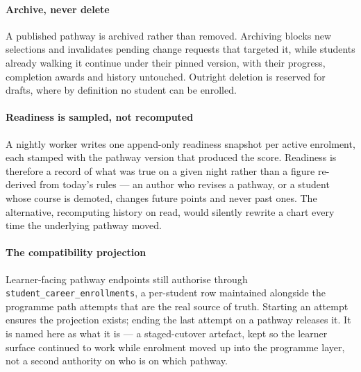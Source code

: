 \paragraph{Archive, never delete}
A published pathway is archived rather than removed. Archiving blocks new selections and invalidates pending change requests that targeted it, while students already walking it continue under their pinned version, with their progress, completion awards and history untouched. Outright deletion is reserved for drafts, where by definition no student can be enrolled.

\paragraph{Readiness is sampled, not recomputed}
A nightly worker writes one append-only readiness snapshot per active enrolment, each stamped with the pathway version that produced the score. Readiness is therefore a record of what was true on a given night rather than a figure re-derived from today's rules --- an author who revises a pathway, or a student whose course is demoted, changes future points and never past ones. The alternative, recomputing history on read, would silently rewrite a chart every time the underlying pathway moved.

\paragraph{The compatibility projection}
Learner-facing pathway endpoints still authorise through \texttt{student\_career\_enrollments}, a per-student row maintained alongside the programme path attempts that are the real source of truth. Starting an attempt ensures the projection exists; ending the last attempt on a pathway releases it. It is named here as what it is --- a staged-cutover artefact, kept so the learner surface continued to work while enrolment moved up into the programme layer, not a second authority on who is on which pathway.
